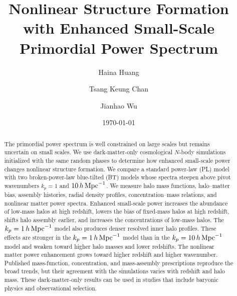 \documentclass[
 reprint,
 superscriptaddress,
 nofootinbib,
 nobibnotes,
 amsmath,
 amssymb,
 aps,
 prd,
 floatfix,
 longbibliography
]{revtex4-2}
\DeclareRobustCommand{\change}[1]{#1}
\begin{document}
\title{Nonlinear Structure Formation with Enhanced Small-Scale Primordial Power Spectrum}

\author{Haina Huang}
\author{Tsang Keung Chan }
\author{Jianhao Wu }

\date{\today}


\begin{abstract}
The primordial power spectrum is well constrained on large scales but remains uncertain on small scales. We use dark-matter-only cosmological \(N\)-body simulations initialized with the same random phases to determine how enhanced small-scale power changes nonlinear structure formation. We compare a standard power-law (PL) model with two broken-power-law blue-tilted (BT) models whose spectra steepen above pivot wavenumbers \(k_p=1\) and \(10\,h\,{\rm Mpc}^{-1}\). We measure halo mass functions, \change{halo--matter bias,} assembly histories, radial density profiles, concentration--mass relations, and nonlinear matter power spectra. Enhanced small-scale power increases the abundance of low-mass halos at high redshift, lowers the bias of fixed-mass halos at high redshift, shifts halo assembly earlier, and increases the concentrations of low-mass halos. The \(k_p=1\,h\,{\rm Mpc}^{-1}\) model also produces denser resolved inner halo profiles. These effects are stronger in the \(k_p=1\,h\,{\rm Mpc}^{-1}\) model than in the \(k_p=10\,h\,{\rm Mpc}^{-1}\) model and weaken toward higher halo masses and lower redshifts. The nonlinear matter power enhancement grows toward higher redshift and higher wavenumber. Published mass-function, concentration, and mass-assembly prescriptions reproduce the broad trends, but their agreement with the simulations varies with redshift and halo mass. These dark-matter-only results can be used in studies that include baryonic physics and observational selection.

\end{abstract}
\end{document}
